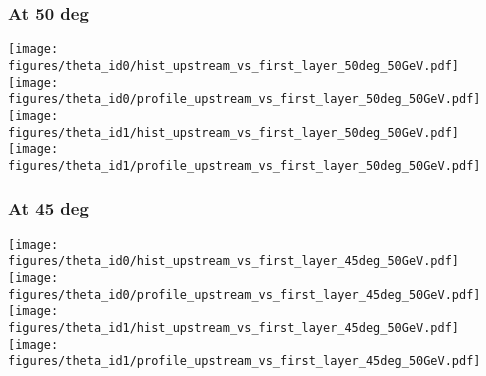 \documentclass{beamer}
\newcommand{\backupbegin}{%
   \newcounter{finalframe}
   \setcounter{finalframe}{\value{framenumber}}
}
\newcommand{\backupend}{%
   \setcounter{framenumber}{\value{finalframe}}
}
\newcommand{\redtext}[1]{%
  \textcolor{myRed}{#1}
}
\begin{document}
\begin{frame}
  \frametitle{At 50 deg}
  \centering
  \texttt{[image: figures/theta\_id0/hist\_upstream\_vs\_first\_layer\_50deg\_50GeV.pdf]}
  \texttt{[image: figures/theta\_id0/profile\_upstream\_vs\_first\_layer\_50deg\_50GeV.pdf]} \\
  \texttt{[image: figures/theta\_id1/hist\_upstream\_vs\_first\_layer\_50deg\_50GeV.pdf]}
  \texttt{[image: figures/theta\_id1/profile\_upstream\_vs\_first\_layer\_50deg\_50GeV.pdf]}
\end{frame}

\begin{frame}
  \frametitle{At 45 deg}
  \centering
  \texttt{[image: figures/theta\_id0/hist\_upstream\_vs\_first\_layer\_45deg\_50GeV.pdf]}
  \texttt{[image: figures/theta\_id0/profile\_upstream\_vs\_first\_layer\_45deg\_50GeV.pdf]} \\
  \texttt{[image: figures/theta\_id1/hist\_upstream\_vs\_first\_layer\_45deg\_50GeV.pdf]}
  \texttt{[image: figures/theta\_id1/profile\_upstream\_vs\_first\_layer\_45deg\_50GeV.pdf]}
\end{frame}

%
%




\end{document}
